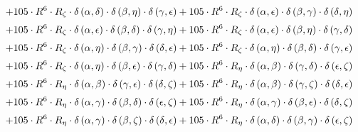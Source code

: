 \begin{subequations}
\begin{gather}
 \\[0.2em] \notag 		 + 105 \cdot R^{6} \cdot R_{\zeta{}} \cdot \delta{}\left(\alpha{}, \delta{}\right) \cdot \delta{}\left(\beta{}, \eta{}\right) \cdot \delta{}\left(\gamma{}, \epsilon{}\right)+ 105 \cdot R^{6} \cdot R_{\zeta{}} \cdot \delta{}\left(\alpha{}, \epsilon{}\right) \cdot \delta{}\left(\beta{}, \gamma{}\right) \cdot \delta{}\left(\delta{}, \eta{}\right) 
 \\[0.2em] \notag 		 + 105 \cdot R^{6} \cdot R_{\zeta{}} \cdot \delta{}\left(\alpha{}, \epsilon{}\right) \cdot \delta{}\left(\beta{}, \delta{}\right) \cdot \delta{}\left(\gamma{}, \eta{}\right)+ 105 \cdot R^{6} \cdot R_{\zeta{}} \cdot \delta{}\left(\alpha{}, \epsilon{}\right) \cdot \delta{}\left(\beta{}, \eta{}\right) \cdot \delta{}\left(\gamma{}, \delta{}\right) 
 \\[0.2em] \notag 		 + 105 \cdot R^{6} \cdot R_{\zeta{}} \cdot \delta{}\left(\alpha{}, \eta{}\right) \cdot \delta{}\left(\beta{}, \gamma{}\right) \cdot \delta{}\left(\delta{}, \epsilon{}\right)+ 105 \cdot R^{6} \cdot R_{\zeta{}} \cdot \delta{}\left(\alpha{}, \eta{}\right) \cdot \delta{}\left(\beta{}, \delta{}\right) \cdot \delta{}\left(\gamma{}, \epsilon{}\right) 
 \\[0.2em] \notag 		 + 105 \cdot R^{6} \cdot R_{\zeta{}} \cdot \delta{}\left(\alpha{}, \eta{}\right) \cdot \delta{}\left(\beta{}, \epsilon{}\right) \cdot \delta{}\left(\gamma{}, \delta{}\right)+ 105 \cdot R^{6} \cdot R_{\eta{}} \cdot \delta{}\left(\alpha{}, \beta{}\right) \cdot \delta{}\left(\gamma{}, \delta{}\right) \cdot \delta{}\left(\epsilon{}, \zeta{}\right) 
 \\[0.2em] \notag 		 + 105 \cdot R^{6} \cdot R_{\eta{}} \cdot \delta{}\left(\alpha{}, \beta{}\right) \cdot \delta{}\left(\gamma{}, \epsilon{}\right) \cdot \delta{}\left(\delta{}, \zeta{}\right)+ 105 \cdot R^{6} \cdot R_{\eta{}} \cdot \delta{}\left(\alpha{}, \beta{}\right) \cdot \delta{}\left(\gamma{}, \zeta{}\right) \cdot \delta{}\left(\delta{}, \epsilon{}\right) 
 \\[0.2em] \notag 		 + 105 \cdot R^{6} \cdot R_{\eta{}} \cdot \delta{}\left(\alpha{}, \gamma{}\right) \cdot \delta{}\left(\beta{}, \delta{}\right) \cdot \delta{}\left(\epsilon{}, \zeta{}\right)+ 105 \cdot R^{6} \cdot R_{\eta{}} \cdot \delta{}\left(\alpha{}, \gamma{}\right) \cdot \delta{}\left(\beta{}, \epsilon{}\right) \cdot \delta{}\left(\delta{}, \zeta{}\right) 
 \\[0.2em] \notag 		 + 105 \cdot R^{6} \cdot R_{\eta{}} \cdot \delta{}\left(\alpha{}, \gamma{}\right) \cdot \delta{}\left(\beta{}, \zeta{}\right) \cdot \delta{}\left(\delta{}, \epsilon{}\right)+ 105 \cdot R^{6} \cdot R_{\eta{}} \cdot \delta{}\left(\alpha{}, \delta{}\right) \cdot \delta{}\left(\beta{}, \gamma{}\right) \cdot \delta{}\left(\epsilon{}, \zeta{}\right) 

\end{gather}
\end{subequations}
